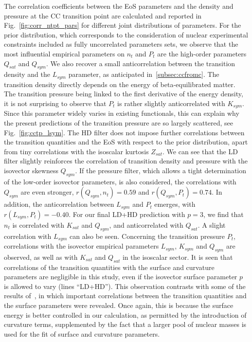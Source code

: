 The correlation coefficients between the EoS parameters and the density and
pressure at the CC transition point are calculated and reported in 
Fig.~\ref{fig:corr_ntpt_pars} for different joint distributions of parameters.
For the prior distribution, which corresponds to the consideration of nuclear
experimental constraints included as fully uncorrelated parameters sets, we 
observe that the most influential empirical parameters on $n_t$ and $P_t$ are 
the high-order parameters $Q_{sat}$ and $Q_{sym}$.
We also recover a small anticorrelation between the transition density and the 
$L_{sym}$ parameter, as anticipated in~\ref{subsec:ccfromc}. The transition 
density directly depends on the energy of beta-equilibrated matter. The 
transition pressure being linked to the first derivative of the energy density, 
it is not surprising to observe that $P_t$ is rather slightly anticorrelated 
with $K_{sym}$. Since this parameter widely varies in existing functionals, 
this can explain why the present predictions of the transition pressure are so 
largely scattered, see Fig.~\ref{fig:cctp_lsym}.
The HD filter does not impose further correlations between the transition
quantities and the EoS with respect to the prior distribution, apart from tiny 
correlations with the isoscalar kurtosis $Z_{sat}$. We can see that the LD 
filter slightly reinforces the correlation of transition density and pressure 
with the isovector skewness $Q_{sym}$. If the pressure filter, which allows a
tight determination of the low-order isovector parameters, is also
considered, the correlations with $Q_{sym}$ are even stronger,
$r(Q_{sym},n_t)=0.59$ and $r(Q_{sym},P_t)=0.74$. In addition, the 
anticorrelation between $L_{sym}$ and $P_t$ emerges, with 
$r(L_{sym},P_t)=-0.40$. For our final LD+HD prediction with $p=3$, we find that
$n_t$ is correlated with $K_{sat}$ and $Q_{sym}$, and anticorrelated with
$Q_{sat}$. A slight correlation with $L_{sym}$ can also be seen. Concerning the
transition pressure $P_t$, correlations with the isovector empirical parameters
$L_{sym}$, $K_{sym}$ and $Q_{sym}$ are observed, as well as with 
$K_{sat}$ and $Q_{sat}$ in the isoscalar sector.
It is seen that correlations of the transition quantities with the surface and
curvature parameters are negligible in this study, even if the isovector
surface parameter $p$ is allowed to vary (lines ``LD+HD''). This observation
contrasts with some of the results of~\cite{Carreau2019cc}, in which 
important correlations between the transition quantities and the surface
parameters were revealed. Once again, this is because the surface energy is
better controlled in our calculation, as permitted by the introduction of 
curvature terms, supplemented by the fact that a larger pool of nuclear masses 
is used for the fit of surface and curvature parameters.

